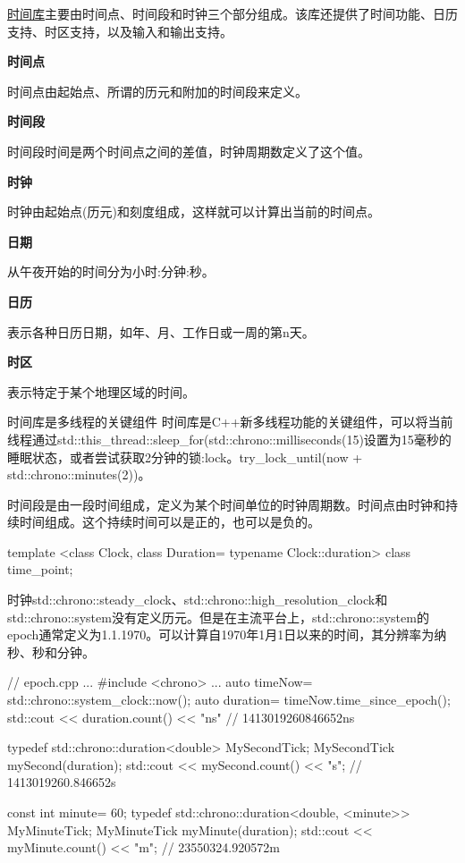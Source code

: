 \href{http://en.cppreference.com/w/cpp/header/chrono}{时间库}主要由时间点、时间段和时钟三个部分组成。该库还提供了时间功能、日历支持、时区支持，以及输入和输出支持。

\hspace*{\fill}

\noindent
\textbf{时间点}

时间点由起始点、所谓的历元和附加的时间段来定义。

\noindent
\textbf{时间段}

时间段时间是两个时间点之间的差值，时钟周期数定义了这个值。

\noindent
\textbf{时钟}
 
时钟由起始点(历元)和刻度组成，这样就可以计算出当前的时间点。

\noindent
\textbf{日期}

从午夜开始的时间分为小时:分钟:秒。

\noindent
\textbf{日历}

表示各种日历日期，如年、月、工作日或一周的第n天。

\noindent
\textbf{时区}

表示特定于某个地理区域的时间。

\begin{myNotic}{时间库是多线程的关键组件}
时间库是C++新多线程功能的关键组件，可以将当前线程通过std::this\_thread::sleep\_for(std::chrono::milliseconds(15)设置为15毫秒的睡眠状态，或者尝试获取2分钟的锁:lock。try\_lock\_until(now + std::chrono::minutes(2))。
\end{myNotic}



时间段是由一段时间组成，定义为某个时间单位的时钟周期数。时间点由时钟和持续时间组成。这个持续时间可以是正的，也可以是负的。

\begin{cpp}
template <class Clock, class Duration= typename Clock::duration> class time_point;
\end{cpp}

时钟std::chrono::steady\_clock、std::chrono::high\_resolution\_clock和std::chrono::system没有定义历元。但是在主流平台上，std::chrono::system的epoch通常定义为1.1.1970。可以计算自1970年1月1日以来的时间，其分辨率为纳秒、秒和分钟。


\begin{cpp}
// epoch.cpp
...
#include <chrono>
...
auto timeNow= std::chrono::system_clock::now();
auto duration= timeNow.time_since_epoch();
std::cout << duration.count() << "ns" // 1413019260846652ns

typedef std::chrono::duration<double> MySecondTick;
MySecondTick mySecond(duration);
std::cout << mySecond.count() << "s"; // 1413019260.846652s

const int minute= 60;
typedef std::chrono::duration<double, <minute>> MyMinuteTick;
MyMinuteTick myMinute(duration);
std::cout << myMinute.count() << "m"; // 23550324.920572m
\end{cpp}


